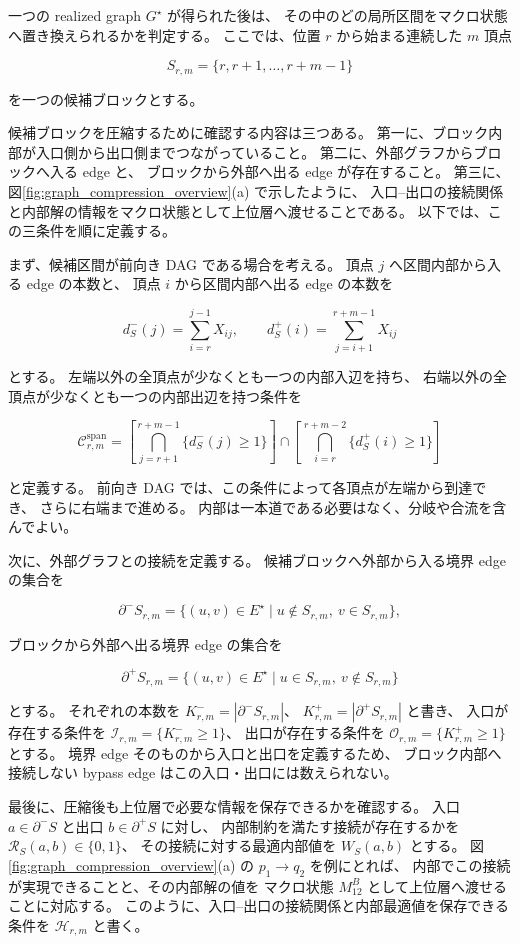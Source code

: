 \documentclass[a4j,10pt]{ujarticle}
\begin{document}
一つの realized graph $G^\star$ が得られた後は、
その中のどの局所区間をマクロ状態へ置き換えられるかを判定する。
ここでは、位置 $r$ から始まる連続した $m$ 頂点

\[
S_{r,m}
=
\{r,r+1,\ldots,r+m-1\}
\]

を一つの候補ブロックとする。

候補ブロックを圧縮するために確認する内容は三つある。
第一に、ブロック内部が入口側から出口側までつながっていること。
第二に、外部グラフからブロックへ入る edge と、
ブロックから外部へ出る edge が存在すること。
第三に、図\ref{fig:graph_compression_overview}(a) で示したように、
入口--出口の接続関係と内部解の情報をマクロ状態として上位層へ渡せることである。
以下では、この三条件を順に定義する。

まず、候補区間が前向き DAG である場合を考える。
頂点 $j$ へ区間内部から入る edge の本数と、
頂点 $i$ から区間内部へ出る edge の本数を

\[
d^-_S(j)
=
\sum_{i=r}^{j-1}X_{ij},
\qquad
d^+_S(i)
=
\sum_{j=i+1}^{r+m-1}X_{ij}
\]

とする。
左端以外の全頂点が少なくとも一つの内部入辺を持ち、
右端以外の全頂点が少なくとも一つの内部出辺を持つ条件を

\begin{equation}
\mathcal C^{\mathrm{span}}_{r,m}
=
\left[
\bigcap_{j=r+1}^{r+m-1}\{d^-_S(j)\ge1\}
\right]
\cap
\left[
\bigcap_{i=r}^{r+m-2}\{d^+_S(i)\ge1\}
\right]
\label{eq:span_ch5}
\end{equation}

と定義する。
前向き DAG では、この条件によって各頂点が左端から到達でき、
さらに右端まで進める。
内部は一本道である必要はなく、分岐や合流を含んでよい。

次に、外部グラフとの接続を定義する。
候補ブロックへ外部から入る境界 edge の集合を

\[
\partial^-S_{r,m}
=
\{(u,v)\in E^\star\mid u\notin S_{r,m},\ v\in S_{r,m}\},
\]

ブロックから外部へ出る境界 edge の集合を

\[
\partial^+S_{r,m}
=
\{(u,v)\in E^\star\mid u\in S_{r,m},\ v\notin S_{r,m}\}
\]

とする。
それぞれの本数を
$K^-_{r,m}=|\partial^-S_{r,m}|$、
$K^+_{r,m}=|\partial^+S_{r,m}|$ と書き、
入口が存在する条件を
$\mathcal I_{r,m}=\{K^-_{r,m}\ge1\}$、
出口が存在する条件を
$\mathcal O_{r,m}=\{K^+_{r,m}\ge1\}$ とする。
境界 edge そのものから入口と出口を定義するため、
ブロック内部へ接続しない bypass edge はこの入口・出口には数えられない。

最後に、圧縮後も上位層で必要な情報を保存できるかを確認する。
入口 $a\in\partial^-S$ と出口 $b\in\partial^+S$ に対し、
内部制約を満たす接続が存在するかを
$\mathcal R_S(a,b)\in\{0,1\}$、
その接続に対する最適内部値を $W_S(a,b)$ とする。
図\ref{fig:graph_compression_overview}(a) の
$p_1\rightarrow q_2$ を例にとれば、
内部でこの接続が実現できることと、その内部解の値を
マクロ状態 $M_{12}^{B}$ として上位層へ渡せることに対応する。
このように、入口--出口の接続関係と内部最適値を保存できる条件を
$\mathcal H_{r,m}$ と書く。
\end{document}
